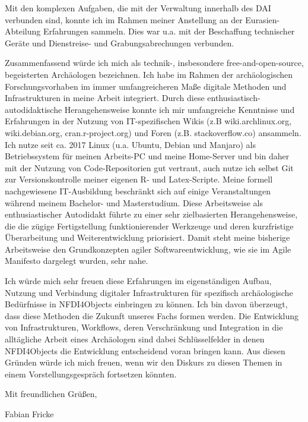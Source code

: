 \documentclass[10pt, a4paper]{article}
\begin{document}
Mit den komplexen Aufgaben, die mit der Verwaltung innerhalb des DAI verbunden sind, konnte ich im Rahmen meiner Anstellung an der Eurasien-Abteilung Erfahrungen sammeln. Dies war u.a. mit der Beschaffung technischer Geräte und Dienstreise- und Grabungsabrechungen verbunden.

Zusammenfassend würde ich mich als technik-, insbesondere free-and-open-source, begeisterten Archäologen bezeichnen. Ich habe im Rahmen der archäologischen Forschungsvorhaben im immer umfangreicheren Maße digitale Methoden und Infrastrukturen in meine Arbeit integriert. Durch diese enthusiastisch-autodidaktische Herangehensweise konnte ich mir umfangreiche Kenntnisse und Erfahrungen in der Nutzung von IT-spezifischen Wikis (z.B wiki.archlinux.org, wiki.debian.org, cran.r-project.org) und Foren (z.B. stackoverflow.co) ansammeln. Ich nutze seit ca. 2017 Linux (u.a. Ubuntu, Debian und Manjaro) als Betriebssystem für meinen Arbeits-PC und meine Home-Server und bin daher mit der Nutzung von Code-Repositorien gut vertraut, auch nutze ich selbst Git zur Versionskontrolle meiner eigenen R- und Latex-Scripte. Meine formell nachgewiesene IT-Ausbildung beschränkt sich auf einige Veranstaltungen während meinem Bachelor- und Masterstudium. Diese Arbeitsweise als enthusiastischer Autodidakt führte  zu einer sehr zielbasierten Herangehensweise, die die zügige Fertigstellung funktionierender Werkzeuge und deren kurzfristige Überarbeitung und Weiterentwicklung priorisiert. Damit steht meine bisherige Arbeitsweise den Grundkonzepten agiler Softwareentwicklung, wie sie im Agile Manifesto dargelegt wurden, sehr nahe.

Ich würde mich sehr freuen diese Erfahrungen im eigenständigen Aufbau, Nutzung und Verbindung digitaler Infrastrukturen für spezifisch archäologische Bedürfnisse in NFDI4Objects einbringen zu können. Ich bin davon überzeugt, dass diese Methoden die Zukunft unseres Fachs formen werden. Die Entwicklung von Infrastrukturen, Workflows, deren Verschränkung und Integration in die alltägliche Arbeit eines Archäologen sind dabei Schlüsselfelder in denen NFDI4Objects die Entwicklung entscheidend voran bringen kann. Aus diesen Gründen würde ich mich freuen, wenn wir den Diskurs zu diesen Themen in einem Vorstellungsgespräch fortsetzen könnten.

Mit freundlichen Grüßen,

Fabian Fricke
\end{document}
